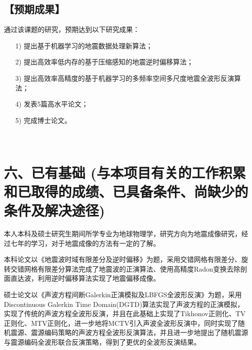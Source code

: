 \documentclass[11pt]{article}
\newcommand{\song}{\CJKfamily{song}}
\newcommand{\hei}{\CJKfamily{hei}}
\newcommand{\kai}{\CJKfamily{kai}}
\begin{document}
\subsection*{\kai\fontsize{11pt}{10pt} \selectfont【预期成果】}
通过该课题的研究，预期达到以下研究成果：
\begin{itemize}[itemindent=10pt]
\setlength{\itemsep}{-5pt}
\item [1)] 
提出基于机器学习的地震数据处理新算法；
\item [2)]
提出高效率低内存的基于压缩感知的地震逆时偏移算法；
\item [3)]
提出高效率高精度的基于机器学习的多频率空间多尺度地震全波形反演算法；
\item [4)]
发表5篇高水平论文；
\item [5)]
完成博士论文。
\end{itemize}
\par
\newpage
\section*{\hei\fontsize{11pt}{10pt} \selectfont \\ 六、已有基础 \song\fontsize{11pt}{10pt} \selectfont (与本项目有关的工作积累和已取得的成绩、已具备条件、尚缺少的条件及解决途径)}
本人本科及硕士研究生期间所学专业为地球物理学，研究方向为地震成像研究，经过七年的学习，对于地震成像的方法有一定的了解。
\par
本科论文以《地震波时域有限差分及逆时偏移》为题，采用交错网格有限差分、旋转交错网格有限差分算法完成了地震波的正演算法、使用高精度Radon变换去除剖面直达波，利用逆时偏移算法实现了地震偏移成像。
\par
硕士论文以《声波方程间断Galerkin正演模拟及L­BFGS全波形反演》为题，采用Discontinuous Galerkin Time Domain(DGTD)算法实现了声波方程的正演模拟，实现了传统的声波方程全波形反演，并且在此基础上实现了Tikhonov正则化、TV正则化、MTV正则化，进一步地将MCTV引入声波全波形反演中，同时实现了随机震源、震源编码策略的声波方程全波形反演算法，并且进一步地提出了随机震源与震源编码全波形联合反演策略，得到了更优的全波形反演结果。
\par
\end{document}
